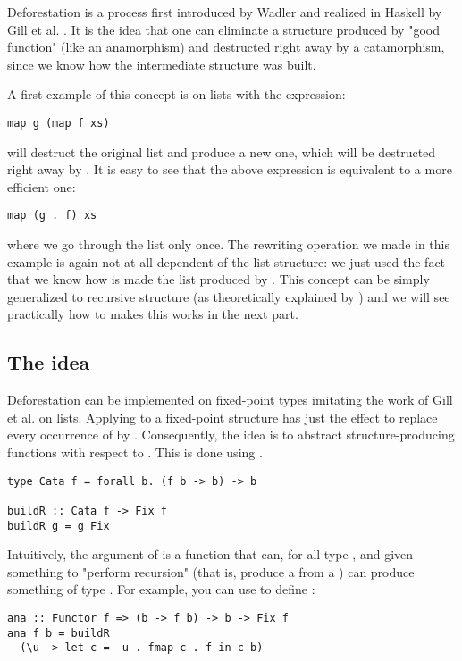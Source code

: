 
Deforestation is a process first introduced by Wadler \cite{WADLER1990231} and realized in Haskell by Gill et al. \cite{Gill:1993:SCD:165180.165214}. It is the idea that one can eliminate a structure produced by "good function" (like an anamorphism) and destructed right away by a catamorphism, since we know how the intermediate structure was built.

A first example of this concept is on lists with the expression:
\begin{verbatim}
map g (map f xs)
\end{verbatim}
 will destruct the original list and produce a new one, which will be destructed right away by . It is easy to see that the above expression is equivalent to a more efficient one:
\begin{verbatim}
map (g . f) xs
\end{verbatim}
\noindent where we go through the list only once.
The rewriting operation we made in this example is again not at all dependent of the list structure: we just used the fact that we know how is made the list produced by . This concept can be simply generalized to recursive structure (as theoretically explained by \cite{Johann:2002:GSF:641433.641471}) and we will see practically how to makes this works in the next part.

\subsection{The idea}
Deforestation can be implemented on fixed-point types imitating the work of Gill et al. \cite{Gill:1993:SCD:165180.165214} on lists. Applying  to a fixed-point structure has just the effect to replace every occurrence of  by . Consequently, the idea is to abstract structure-producing functions with respect to . This is done using .

\begin{verbatim}
type Cata f = forall b. (f b -> b) -> b

buildR :: Cata f -> Fix f
buildR g = g Fix
\end{verbatim}

\noindent Intuitively, the argument of  is a function that can, for all type , and given something to "perform recursion" (that is, produce a  from a ) can produce something of type . For example, you can use  to define :
\begin{verbatim}
ana :: Functor f => (b -> f b) -> b -> Fix f
ana f b = buildR
  (\u -> let c =  u . fmap c . f in c b)
\end{verbatim}

